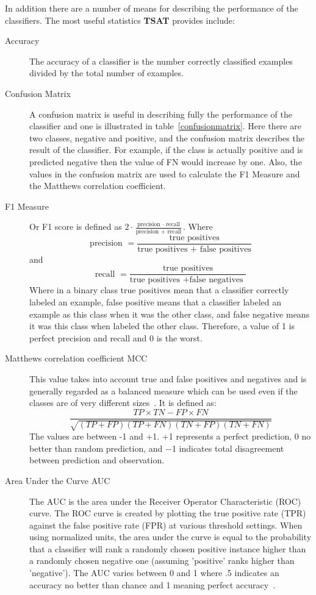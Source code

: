 \documentclass[titlepage, letterpaper, 12pt]{article}
\newcommand\TSAT{\textbf{TSAT}}
\begin{document}
In addition there are a number of means for describing the performance of the classifiers.  The most useful statistics {\TSAT} provides include:
\begin{description}
	\item[Accuracy] The accuracy of a classifier is the number correctly classified examples divided by the total number of examples. 
	\item[Confusion Matrix] A confusion matrix is useful in describing fully the performance of the classifier and one is illustrated in table~\ref{confusionmatrix}.  Here there are two classes, negative and positive, and the confusion matrix describes the result of the classifier.  For example, if the class is actually positive and is predicted negative then the value of FN would increase by one.  Also, the values in the confusion matrix are used to calculate the F1 Measure and the Matthews correlation coefficient.
	\item[F1 Measure] Or F1 score is defined as \(2\cdot \frac{\textrm{precision }\cdot \textrm{ recall}}{\textrm{precision }+\textrm{ recall}}\).  Where \[\textrm{precision } = \frac{\textrm{true positives}}{\textrm{true positives } + \textrm{ false positives}}\] and \[\textrm{recall } = \frac{\textrm{true positives}}{\textrm{true positives } + \textrm{false negatives }}\]  Where in a binary class true positives mean that a classifier correctly labeled an example, false positive means that a classifier labeled an example as this class when it was the other class, and false negative means it was this class when labeled the other class.  Therefore, a value of 1 is perfect precision and recall and 0 is the worst.
	\item[Matthews correlation coefficient MCC] This value takes into account true and false positives and negatives and is generally regarded as a balanced measure which can be used even if the classes are of very different sizes~\cite{MCC}.  It is defined as: \[\frac{TP\times TN - FP \times FN}{\sqrt{(TP + FP)(TP + FN)(TN+FP)(TN+FN)}} \] The values are between -1 and +1. +1 represents a perfect prediction, 0 no better than random prediction, and −1 indicates total disagreement between prediction and observation.
	\item[Area Under the Curve AUC] The AUC is the area under the Receiver Operator Characteristic (ROC) curve.  The ROC curve is created by plotting the true positive rate (TPR) against the false positive rate (FPR) at various threshold settings.  When using normalized units, the area under the curve is equal to the probability that a classifier will rank a randomly chosen positive instance higher than a randomly chosen negative one (assuming 'positive' ranks higher than 'negative').  The AUC varies between 0 and 1 where .5 indicates an accuracy no better than chance and 1 meaning perfect accuracy~\cite{AUC}.

\end{description}
\end{document}
